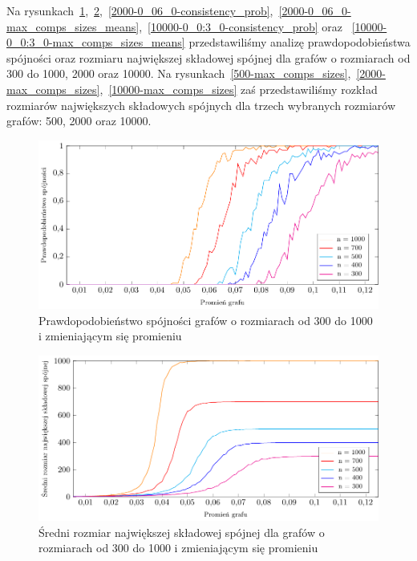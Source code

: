 		Na rysunkach~\ref{500-0_0010_125_consistency_prob},~\ref{500-0_0010_125_max_comps_sizes_means},~\ref{2000-0_06_0-consistency_prob},~\ref{2000-0_06_0-max_comps_sizes_means},~\ref{10000-0_0:3_0-consistency_prob} oraz ~\ref{10000-0_0:3_0-max_comps_sizes_means} przedstawiliśmy analizę prawdopodobieństwa spójności oraz rozmiaru największej składowej spójnej dla grafów o rozmiarach od 300 do 1000, 2000 oraz 10000. Na rysunkach~\ref{500-max_comps_sizes},~\ref{2000-max_comps_sizes},~\ref{10000-max_comps_sizes} zaś przedstawiliśmy rozkład rozmiarów największych składowych spójnych dla trzech wybranych rozmiarów grafów: 500, 2000 oraz 10000.

		\begin{figure}[h!]
			\centering
			\includegraphics[scale=0.8]{500-0_0010_125_consistency_prob.pdf}
			\caption{Prawdopodobieństwo spójności grafów o rozmiarach od 300 do 1000 i zmieniającym się promieniu}
			\label{500-0_0010_125_consistency_prob}
		\end{figure}

		\begin{figure}
			\centering
			\includegraphics[scale=0.8]{500-0_0010_125_max_comps_sizes_means.pdf}
			\caption{Średni rozmiar największej składowej spójnej dla grafów o rozmiarach od 300 do 1000 i zmieniającym się promieniu}
			\label{500-0_0010_125_max_comps_sizes_means}
		\end{figure}

